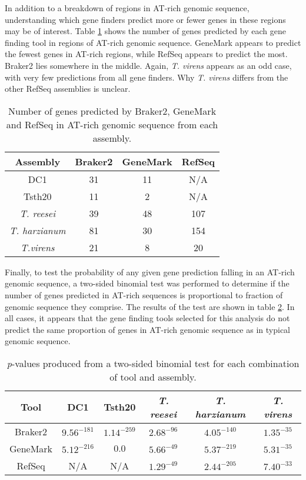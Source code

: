 In addition to a breakdown of regions in AT-rich genomic sequence,
understanding which gene finders predict more or fewer genes in these
regions may be of interest. Table \ref{table:gc-gene-counts} shows the
number of genes predicted by each gene finding tool in regions of
AT-rich genomic sequence. GeneMark appears to predict the fewest genes
in AT-rich regions, while RefSeq appears to predict the most. Braker2
lies somewhere in the middle. Again, \textit{T. virens} appears as an
odd case, with very few predictions from all gene finders. Why
\textit{T. virens} differs from the other RefSeq assemblies is
unclear.

\begin{table}
  \begin{center}
    \begin{tabular}{|c|c|c|c|}
      \hline
      Assembly & Braker2 & GeneMark & RefSeq \\ \hline
      DC1 & 31 & 11 & N/A \\ \hline
      Tsth20 & 11 & 2 & N/A \\ \hline
      \textit{T. reesei} & 39 & 48 & 107 \\ \hline
      \textit{T. harzianum} & 81 & 30 & 154 \\ \hline
      \textit{T.virens} & 21 & 8 & 20 \\ \hline
    \end{tabular}
  \end{center}
  \caption{Number of genes predicted by Braker2, GeneMark and RefSeq
    in AT-rich genomic sequence from each assembly.}
  \label{table:gc-gene-counts}
\end{table}

Finally, to test the probability of any given gene prediction falling
in an AT-rich genomic sequence, a two-sided binomial test was
performed to determine if the number of genes predicted in AT-rich
sequences is proportional to fraction of genomic sequence they
comprise. The results of the test are shown in table
\ref{table:gc-binomial}. In all cases, it appears that the gene
finding tools selected for this analysis do not predict the same
proportion of genes in AT-rich genomic sequence as in typical genomic
sequence.

\begin{table}
  \begin{center}
    \begin{tabular}{|c|c|c|c|c|c|}
      \hline
      Tool & DC1 & Tsth20 & \textit{T. reesei} & \textit{T. harzianum} & \textit{T. virens} \\ \hline
      Braker2 & $9.56^{-181}$ & $1.14^{-259}$ & $2.68^{-96}$ & $4.05^{-140}$ & $1.35^{-35}$ \\ \hline
      GeneMark & $5.12^{-216}$ & $0.0$ & $5.66^{-49}$ & $5.37^{-219}$ & $5.31^{-35}$ \\ \hline
      RefSeq & N/A & N/A & $1.29^{-49}$ & $2.44^{-205}$ & $7.40^{-33}$ \\ \hline
    \end{tabular}
  \end{center}
  \caption{\textit{p}-values produced from a two-sided binomial test
    for each combination of tool and assembly.}
  \label{table:gc-binomial}
\end{table}

